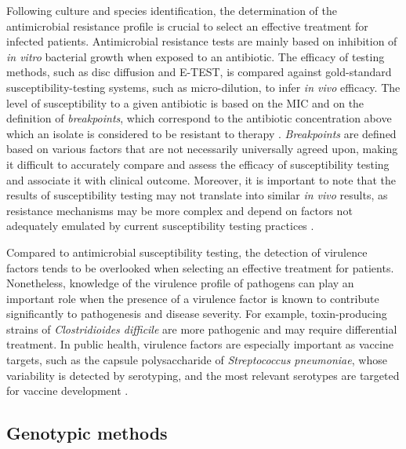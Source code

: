 Following culture and species identification, the determination of the antimicrobial resistance profile is crucial to select an effective treatment for infected patients. Antimicrobial resistance tests are mainly based on inhibition of \textit{in vitro} bacterial growth when exposed to an antibiotic. The efficacy of testing methods, such as disc diffusion and E-TEST, is compared against gold-standard susceptibility-testing systems, such as micro-dilution, to infer \textit{in vivo} efficacy.
The level of susceptibility to a given antibiotic is based on the \ac{MIC} and on the definition of \textit{breakpoints}, which correspond to the antibiotic concentration above which an isolate is considered to be resistant to therapy \cite{didelot_transforming_2012}. \textit{Breakpoints} are defined based on various factors that are not necessarily universally agreed upon, making it difficult to accurately compare and assess the efficacy of susceptibility testing and associate it with clinical outcome. Moreover, it is important to note that the results of susceptibility testing may not translate into similar \textit{in vivo} results, as resistance mechanisms may be more complex and depend on factors not adequately emulated by current susceptibility testing practices \cite{didelot_transforming_2012, hassall_limitations_2024}.

Compared to antimicrobial susceptibility testing, the detection of virulence factors tends to be overlooked when selecting an effective treatment for patients. Nonetheless, knowledge of the virulence profile of pathogens can play an important role when the presence of a virulence factor is known to contribute significantly to pathogenesis and disease severity. For example, toxin-producing strains of \textit{Clostridioides difficile} are more pathogenic and may require differential treatment. In public health, virulence factors are especially important as vaccine targets, such as the capsule polysaccharide of \textit{Streptococcus pneumoniae}, whose variability is detected by serotyping, and the most relevant serotypes are targeted for vaccine development \cite{henrichsen_six_1995, tarrago_identification_2008, silva-costa_adult_2023, musher_remarkable_2022}.

\subsection{Genotypic methods}

